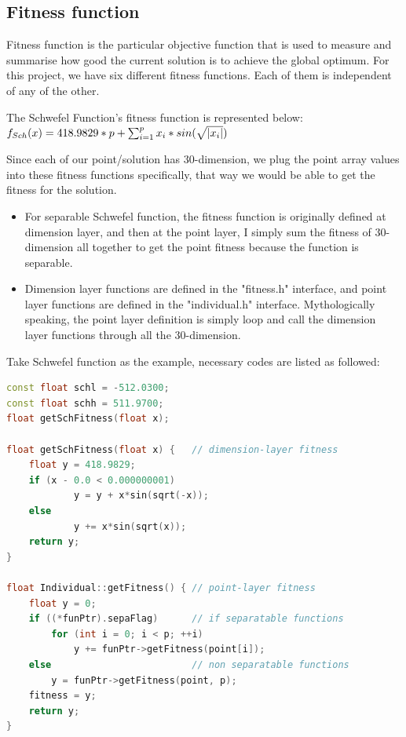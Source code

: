 \documentclass[10pt,b5paper]{article}
\begin{document}
\subsection{Fitness function}
\label{sec-2-4}
Fitness function is the particular objective function that is used to measure and summarise how good the current solution is to achieve the global optimum. For this project, we have six different fitness functions. Each of them is independent of any of the other.

The Schwefel Function's fitness function is represented below:
\begin{math}
\noindent
\\ f_{Sch}(x) = 418.9829*p + \sum\nolimits_{i=1}^{p} x_i*sin(\sqrt{|x_i|})
\end{math}

Since each of our point/solution has 30-dimension, we plug the point array values into these fitness functions specifically, that way we would be able to get the fitness for the solution.
\begin{itemize}
\item For separable Schwefel function, the fitness function is originally defined at dimension layer, and then at the point layer, I simply sum the fitness of 30-dimension all together to get the point fitness because the function is separable.
\item Dimension layer functions are defined in the "fitness.h" interface, and point layer functions are defined in the "individual.h" interface. Mythologically speaking, the point layer definition is simply loop and call the dimension layer functions through all the 30-dimension.
\end{itemize}

Take Schwefel function as the example, necessary codes are listed as followed: 
\begin{lstlisting}[language=c++]
const float schl = -512.0300; 
const float schh = 511.9700; 
float getSchFitness(float x);

float getSchFitness(float x) {   // dimension-layer fitness
    float y = 418.9829;
    if (x - 0.0 < 0.000000001) 
            y = y + x*sin(sqrt(-x));
    else
            y += x*sin(sqrt(x));
    return y;
}

float Individual::getFitness() { // point-layer fitness
    float y = 0;
    if ((*funPtr).sepaFlag)      // if separatable functions
        for (int i = 0; i < p; ++i) 
            y += funPtr->getFitness(point[i]);          
    else                         // non separatable functions   
        y = funPtr->getFitness(point, p);
    fitness = y;
    return y;
}
\end{lstlisting}
\end{document}
